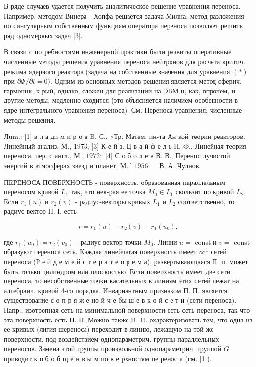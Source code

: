 \documentclass[10pt]{article}
\begin{document}
В ряде случаев удается получить аналитическое решение уравнения переноса. Например, методом Винера - Хопфа решается задача Милна; метод разложения по сингулярным собственным функциям оператора переноса позволяет решить ряд одномерных задач [3].



В связи с потребностями инженерной практики были развиты оперативные численные методы решения уравнения переноса нейтронов для расчета критич. режима ядерного реактора (задача на собственные значения для уравнения $(*)$ при $\partial \Phi / \partial t=0)$. Одним из основных методов решения является метод сферич. гармоник, к-рый, однако, сложен для реализации на ЭВМ и, как, впрочем, и другие методы, медленно сходится (это объясняется наличием особенности в ядре интегрального уравнения переноса). См. Переноса уравнения; численные методы решения.



Лum.: [1] в л а ди м и р о в B. С., «Тр. Матем. ин-та Ан кой теории реакторов. Линейный анализ, М., 1973; [3] К е й з. Ц в а й ф е л ь П. Ф., Линейная теория переноса, пер. с англ., М., $1972 ;$ [4] С о б о л е в В. В., Перенос лучистой энергий в атмосферах звезд и планет, М.,' $1956 . \quad$ В. А. Чулнов.



ПЕРЕНОСА ПОВЕРХНОСТЬ - поверхность, образованная параллельным переносом кривой $L_{1}$ так, что нек-рая ее точка $M_{0} \in L_{1}$ скользит по кривой $L_{2}$. Если $r_{1}(u)$ и $r_{2}(v)$ - радиус-векторы кривых $L_{1}$ и $L_{2}$ соответственно, то радиус-вектор П. І. есть



\[

r=r_{1}(u)+r_{2}(v)-r_{1}\left(u_{0}\right),

\]



где $r_{1}\left(u_{0}\right)=r_{2}\left(v_{0}\right)$ - радиус-вектор точки $M_{0}$. Линии $u=$ const и $v=$ const образуют переноса сеть. Каждая линейчатая поверхность имеет $\infty^{1}$ сетей переноса (Р е й д е м е й с т е р а т е о р е м а), развертывающаяся П. п. может быть только цилиндром или плоскостью. Если поверхность имеет две сети переноса, то несобственные точки касательных к линиям этих сетей лежат на алгебраич. кривой 4-го порядка. Инвариантным признаком П. П. является существование с о п р я ж е но й ч е бы ш е в к о й с е т и (сети переноса). Напр., изотропная сеть на минимальной поверхности есть сеть переноса, так что эта поверхность есть П. П. Можно также П. П. охарактеризовать тем, что одна из ее кривых (лиғия шереноса) переходит в линию, лежащую на той же поверхности, под воздействием однопараметрич. группы параллельных переносов. Замена этой группы произвольной однопараметрич. группой $G$ приводит к о б о б щ е н в ы м по в е рхностям пе ренос а (см. [1]).
\end{document}
